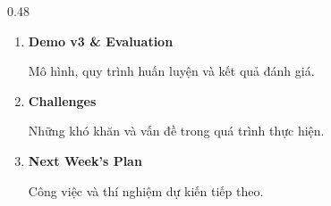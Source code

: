 \begin{frame}
\begin{columns}[T,onlytextwidth]
\begin{column}{0.48\textwidth}
            \vspace{0.1cm}

            \begin{enumerate}
                \small
                \setcounter{enumi}{3}
                \setlength{\itemsep}{0.12cm}

                \item \textbf{Demo v3 \& Evaluation}

                {\footnotesize Mô hình, quy trình huấn luyện và kết quả đánh giá.}

                \item \textbf{Challenges}

                {\footnotesize Những khó khăn và vấn đề trong quá trình thực hiện.}

                \item \textbf{Next Week's Plan}

                {\footnotesize Công việc và thí nghiệm dự kiến tiếp theo.}
            \end{enumerate}
        \end{column}

    \end{columns}

\end{frame}
